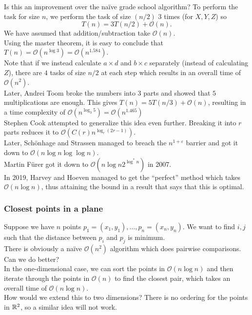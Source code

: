Is this an improvement over the na\"ive grade school algorithm? To perform the task for size $n$, we perform the task of size $(n/2)$ $3$ times (for $X, Y, Z$) so
\[ T(n) = 3 T(n/2) + \mathcal{O}(n). \]
We have assumed that addition/subtraction take $\mathcal{O}(n)$.\\
Using the master theorem, it is easy to conclude that $T(n)=\mathcal{O}(n^{\log 3}) = \mathcal{O}(n^{1.584})$.\\ Note that if we instead calculate $a\times d$ and $b\times c$ separately (instead of calculating $Z$), there are $4$ tasks of size $n/2$ at each step which results in an overall time of $\mathcal{O}(n^2)$.\\


Later, Andrei Toom broke the numbers into $3$ parts and showed that $5$ multiplications are enough. This gives $T(n)=5T(n/3)+\mathcal{O}(n)$, resulting in a time complexity of $\mathcal{O}(n^{\log_3 5}) = \mathcal{O}(n^1.465)$\\

Stephen Cook attempted to generalize this idea even further. Breaking it into $r$ parts reduces it to $\mathcal{O}(C(r)n^{\log_r(2r-1)})$.\\
Later, Sch\"onhage and Strassen managed to breach the $n^{1+\varepsilon}$ barrier and got it down to $\mathcal{O}(n \log n \log\log n)$.\\
Martin F\"urer got it down to $\mathcal{O}(n\log n 2^{\log^* n})$ in 2007.\\
In 2019, Harvey and Hoeven managed to get the ``perfect'' method which takes $\mathcal{O}(n\log n)$, thus attaining the bound in a result that says that this is optimal.\\

\subsubsection{Closest points in a plane}

Suppose we have $n$ points $p_1=(x_1,y_1),\ldots,p_n=(x_n,y_n)$. We want to find $i,j$ such that the distance between $p_i$ and $p_j$ is minimum.\\

There is obviously a na\"ive $\mathcal{O}(n^2)$ algorithm which does pairwise comparisons. Can we do better?\\

In the one-dimensional case, we can sort the points in $\mathcal{O}(n\log n)$ and then iterate through the points in $\mathcal{O}(n)$ to find the closest pair, which takes an overall time of $\mathcal{O}(n\log n)$.\\
How would we extend this to two dimensions? There is no ordering for the points in $\mathbb{R}^2$, so a similar idea will not work.\\

